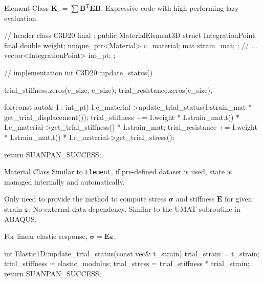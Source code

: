 \documentclass[fleqn,10pt]{beamer}
\begin{document}
\begin{frame}[containsverbatim]{Element Class}
$\mathbold{K}_e=\sum\mathbold{B}^\mathrm{T}\mathbold{E}\mathbold{B}$. Expressive code with high performing lazy evaluation.
\begin{cppcode}[fontsize=\tiny,highlightlines={18-20}]
// header
class C3D20 final : public MaterialElement3D {
    struct IntegrationPoint final {
        double weight;
        unique_ptr<Material> c_material;
        mat strain_mat;
    };
    // ...
    vector<IntegrationPoint> int_pt;
};

// implementation
int C3D20::update_status() {
    trial_stiffness.zeros(c_size, c_size);
    trial_resistance.zeros(c_size);

    for(const auto& I : int_pt) {
        I.c_material->update_trial_status(I.strain_mat * get_trial_displacement());
        trial_stiffness += I.weight * I.strain_mat.t() * I.c_material->get_trial_stiffness() * I.strain_mat;
        trial_resistance += I.weight * I.strain_mat.t() * I.c_material->get_trial_stress();
    }

    return SUANPAN_SUCCESS;
}
\end{cppcode}
\end{frame}
\begin{frame}[containsverbatim]{Material Class}
Similar to \texttt{Element}, if pre-defined dataset is used, state is managed internally and automatically.

Only need to provide the method to compute stress $\mathbold{\sigma}$ and stiffness $\mathbold{E}$ for given strain $\mathbold{\varepsilon}$. No external data dependency. Similar to the UMAT subroutine in ABAQUS.

For linear elastic response, $\mathbold{\sigma=E\varepsilon}$.
\begin{cppcode}
int Elastic1D::update_trial_status(const vec& t_strain) {
    trial_strain = t_strain;
    trial_stiffness = elastic_modulus;
    trial_stress = trial_stiffness * trial_strain;
    return SUANPAN_SUCCESS;
}
\end{cppcode}
\end{frame}
\end{document}
